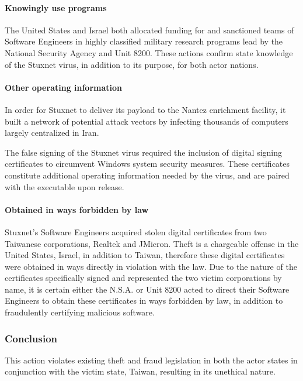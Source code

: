 \documentclass[12pt]{article}
\begin{document}
\begin{multicols}{2}
\paragraph{Knowingly use programs}

The United States and Israel both allocated funding for and sanctioned teams of Software Engineers in highly classified military research programs lead by the National Security Agency and Unit 8200.\cite{NSAandUnit8200} These actions confirm state knowledge of the Stuxnet virus, in addition to its purpose, for both actor nations.

\paragraph{Other operating information}

In order for Stuxnet to deliver its payload to the Nantez enrichment facility, it built a network of potential attack vectors by infecting thousands of computers largely centralized in Iran.

The false signing of the Stuxnet virus required the inclusion of digital signing certificates to circumvent Windows system security measures. These certificates constitute additional operating information needed by the virus, and are paired with the executable upon release.

\paragraph{Obtained in ways forbidden by law}

Stuxnet's Software Engineers acquired stolen digital certificates from two Taiwanese corporations, Realtek and JMicron.\cite{signedUsingCertificates} Theft is a chargeable offense in the United States, Israel, in addition to Taiwan, therefore these digital certificates were obtained in ways directly in violation with the law. Due to the nature of the certificates specifically signed and represented the two victim corporations by name, it is certain either the N.S.A. or Unit 8200 acted to direct their Software Engineers to obtain these certificates in ways forbidden by law, in addition to fraudulently certifying malicious software.

\subsubsection{Conclusion}

This action violates existing theft and fraud legislation in both the actor states in conjunction with the victim state, Taiwan, resulting in its unethical nature.


\end{multicols}
\end{document}
